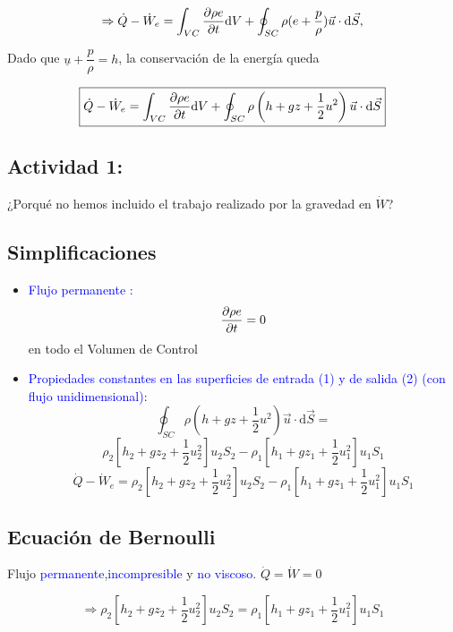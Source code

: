 	\[
	\Rightarrow\dot{Q}-\dot{W}_{e}=\int_{VC}\frac{\partial \rho e}{\partial t}\text{d}V+\oint_{SC}\rho(e+\dfrac{p}{\rho})\vec{u}\cdot\text{d}\vec{S},
	\]
	
	Dado que $\underline{u}+\dfrac{p}{\rho}=h$, la conservación de la
	energía queda 
	

	\begin{equation}
		\boxed{\dot{Q}-\dot{W}_{e}=\int_{VC}\frac{\partial \rho e}{\partial t}\text{d}V+\oint_{SC}\rho\left(h+gz+\frac{1}{2}u^{2}\right)\vec{u}\cdot\text{d}\vec{S}}
	\end{equation}
	
	
	\subsection*{Actividad 1:}
		¿Porqué no hemos incluido el trabajo realizado por la gravedad en
		$\dot{W}$?

\subsection*{Simplificaciones}
	
	\begin{itemize}
		\item \textcolor{blue}{Flujo permanente :} 
		\[
		\frac{\partial \rho e}{\partial t}=0
		\]
		en todo el Volumen de Control 
		\item \textcolor{blue}{Propiedades constantes en las superficies de entrada
			(1) y de salida (2) (con flujo unidimensional)}: 
		\[
		\oint_{SC}\rho\left(h+gz+\frac{1}{2}u^{2}\right)\vec{u}\cdot\text{d}\vec{S}=
		\]
		\[
		\rho_{2}\left[h_{2}+gz_{2}+\frac{1}{2}u_{2}^{2}\right]u_{2}S_{2}-\rho_{1}\left[h_{1}+gz_{1}+\frac{1}{2}u_{1}^{2}\right]u_{1}S_{1}
		\]
		\[
		\boxed{\dot{Q}-\dot{W}_{e}=\rho_{2}\left[h_{2}+gz_{2}+\frac{1}{2}u_{2}^{2}\right]u_{2}S_{2}-\rho_{1}\left[h_{1}+gz_{1}+\frac{1}{2}u_{1}^{2}\right]u_{1}S_{1}}
		\]
	\end{itemize}

\subsection{Ecuación de Bernoulli}

	
	Flujo \textcolor{blue}{permanente},\textcolor{blue}{incompresible}
	y \textcolor{blue}{no viscoso}. $\dot{Q}=\dot{W}=0$
	
	\[
	\Rightarrow\rho_{2}\left[h_{2}+gz_{2}+\frac{1}{2}u_{2}^{2}\right]u_{2}S_{2}=\rho_{1}\left[h_{1}+gz_{1}+\frac{1}{2}u_{1}^{2}\right]u_{1}S_{1}
	\]
	
